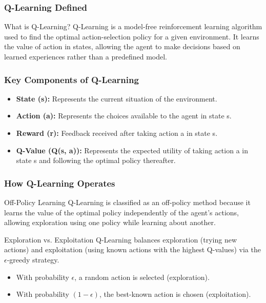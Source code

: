 \documentclass[aspectratio=169]{beamer}
\begin{document}
\begin{frame}[fragile]
    \frametitle{Q-Learning Defined}
    \begin{block}{What is Q-Learning?}
        Q-Learning is a model-free reinforcement learning algorithm used to find the optimal action-selection policy for a given environment. It learns the value of action in states, allowing the agent to make decisions based on learned experiences rather than a predefined model.
    \end{block}
\end{frame}

\begin{frame}[fragile]
    \frametitle{Key Components of Q-Learning}
    \begin{itemize}
        \item \textbf{State (s):} Represents the current situation of the environment.
        \item \textbf{Action (a):} Represents the choices available to the agent in state s.
        \item \textbf{Reward (r):} Feedback received after taking action a in state s.
        \item \textbf{Q-Value (Q(s, a)):} Represents the expected utility of taking action a in state s and following the optimal policy thereafter.
    \end{itemize}
\end{frame}

\begin{frame}[fragile]
    \frametitle{How Q-Learning Operates}
    \begin{block}{Off-Policy Learning}
        Q-Learning is classified as an off-policy method because it learns the value of the optimal policy independently of the agent’s actions, allowing exploration using one policy while learning about another.
    \end{block}
    
    \begin{block}{Exploration vs. Exploitation}
        Q-Learning balances exploration (trying new actions) and exploitation (using known actions with the highest Q-values) via the $\epsilon$-greedy strategy.
        \begin{itemize}
            \item With probability $\epsilon$, a random action is selected (exploration).
            \item With probability $(1-\epsilon)$, the best-known action is chosen (exploitation).
        \end{itemize}
    \end{block}
\end{frame}
\end{document}
